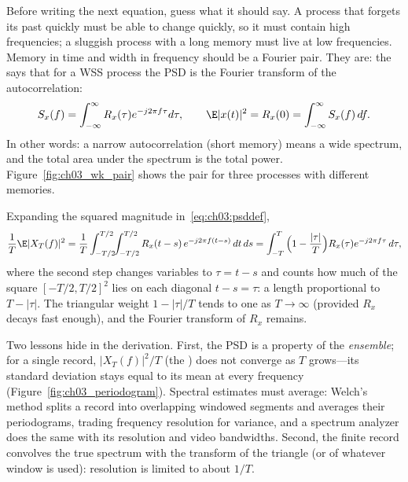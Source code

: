 Before writing the next equation, guess what it should say. A process that forgets its past quickly
must be able to change quickly, so it must contain high frequencies; a sluggish process with a long
memory must live at low frequencies. Memory in time and width in frequency should be a
Fourier pair. They are: the  says that for a WSS process the PSD is the
Fourier transform of the autocorrelation:
\begin{equation}
S_x(f)=\int_{-\infty}^{\infty}R_x(\tau)e^{-j2\pi f\tau}d\tau,\qquad \E|x(t)|^2=R_x(0)=\int_{-\infty}^{\infty} S_x(f)\,df.
\label{eq:ch03:wk}
\end{equation}
In other words: a narrow autocorrelation (short memory) means a wide spectrum, and the total area
under the spectrum is the total power. Figure~\ref{fig:ch03_wk_pair} shows the pair for three
processes with different memories.


\begin{deeper}
Expanding the squared magnitude in~\eqref{eq:ch03:psddef},
\[
\frac1T\E|X_T(f)|^2=\frac1T\int_{-T/2}^{T/2}\!\!\int_{-T/2}^{T/2}R_x(t-s)\,e^{-j2\pi f(t-s)}\,dt\,ds
=\int_{-T}^{T}\Big(1-\frac{|\tau|}{T}\Big)R_x(\tau)e^{-j2\pi f\tau}\,d\tau ,
\]
where the second step changes variables to $\tau=t-s$ and counts how much of the square
$[-T/2,T/2]^2$ lies on each diagonal $t-s=\tau$: a length proportional to $T-|\tau|$. The triangular
weight $1-|\tau|/T$ tends to one as $T\to\infty$ (provided $R_x$ decays fast enough), and the Fourier
transform of $R_x$ remains.
\end{deeper}

Two lessons hide in the derivation. First, the PSD is a property of the \emph{ensemble}; for a single
record, $|X_T(f)|^2/T$ (the ) does not converge as $T$ grows---its standard deviation
stays equal to its mean at every frequency (Figure~\ref{fig:ch03_periodogram}). Spectral estimates
must average: Welch's method splits a record into overlapping windowed segments and averages their
periodograms, trading frequency resolution for variance, and a spectrum analyzer does the same with
its resolution and video bandwidths. Second, the finite record convolves the true spectrum with the
transform of the triangle (or of whatever window is used): resolution is limited to about $1/T$.

